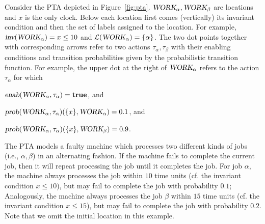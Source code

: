 \begin{example}\label{ex:pta}
Consider the PTA depicted in Figure~\ref{fig:pta}.
$\mbox{\sl WORK}_{\alpha},\mbox{\sl WORK}_{\beta}$ are locations
and $x$ is the only clock. Below each location first comes (vertically) its invariant condition and then the set of labels assigned to the location. For example, $\mbox{\sl inv}(\mbox{\sl WORK}_{\alpha})=x \le 10$
and $\mathcal{L}(\mbox{\sl WORK}_{\alpha})=\{ \alpha \}$.
The two dot points together with corresponding arrows refer to two actions $\tau_\alpha,\tau_\beta$ with their enabling conditions and transition probabilities given by the probabilistic transition function.
For example, the upper dot at the right of $\mbox{\sl WORK}_{\alpha}$ refers to the action $\tau_\alpha$ for which
\begin{compactitem}
\item $\mbox{\sl enab}(\mbox{\sl WORK}_{\alpha}, \tau_\alpha)=\mathbf{true}$, and
\item $\mbox{\sl prob}(\mbox{\sl WORK}_{\alpha}, \tau_\alpha)(\{x\},\mbox{\sl WORK}_{\alpha})=0.1$, and
\item $\mbox{\sl prob}(\mbox{\sl WORK}_{\alpha}, \tau_\alpha)(\{x\},\mbox{\sl WORK}_{\beta})=0.9$.
\end{compactitem}
The PTA models a faulty machine which processes two different kinds of jobs (i.e., $\alpha,\beta$) in an alternating fashion.
If the machine fails to complete the current job, then it will repeat processing the job until it completes the job.
For job $\alpha$, the machine always processes the job within $10$ time units (cf. the invariant condition $x\le 10$), but may fail to complete the job with probability $0.1$;
Analogously, the machine always processes the job $\beta$ within $15$ time units (cf. the invariant condition $x\le 15$), but may fail to complete the job with probability $0.2$.
Note that we omit the initial location in this example.
\end{example}
%
%

